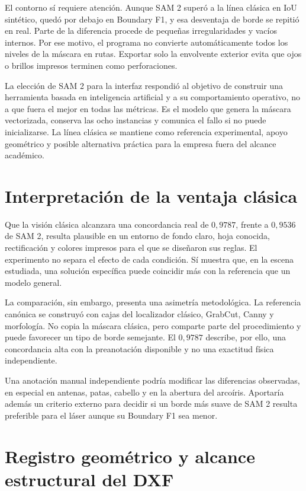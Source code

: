 El contorno sí requiere atención. Aunque SAM 2 superó a la línea clásica en IoU sintético, quedó por debajo en Boundary F1, y esa desventaja de borde se repitió en real. Parte de la diferencia procede de pequeñas irregularidades y vacíos internos. Por ese motivo, el programa no convierte automáticamente todos los niveles de la máscara en rutas. Exportar solo la envolvente exterior evita que ojos o brillos impresos terminen como perforaciones.

La elección de SAM 2 para la interfaz respondió al objetivo de construir una herramienta basada en inteligencia artificial y a su comportamiento operativo, no a que fuera el mejor en todas las métricas. Es el modelo que genera la máscara vectorizada, conserva las ocho instancias y comunica el fallo si no puede inicializarse. La línea clásica se mantiene como referencia experimental, apoyo geométrico y posible alternativa práctica para la empresa fuera del alcance académico.

\section{Interpretación de la ventaja clásica}

Que la visión clásica alcanzara una concordancia real de $0{,}9787$, frente a $0{,}9536$ de SAM 2, resulta plausible en un entorno de fondo claro, hoja conocida, rectificación y colores impresos para el que se diseñaron sus reglas. El experimento no separa el efecto de cada condición. Sí muestra que, en la escena estudiada, una solución específica puede coincidir más con la referencia que un modelo general.

La comparación, sin embargo, presenta una asimetría metodológica. La referencia canónica se construyó con cajas del localizador clásico, GrabCut, Canny y morfología. No copia la máscara clásica, pero comparte parte del procedimiento y puede favorecer un tipo de borde semejante. El $0{,}9787$ describe, por ello, una concordancia alta con la preanotación disponible y no una exactitud física independiente.

Una anotación manual independiente podría modificar las diferencias observadas, en especial en antenas, patas, cabello y en la abertura del arcoíris. Aportaría además un criterio externo para decidir si un borde más suave de SAM 2 resulta preferible para el láser aunque su Boundary F1 sea menor.

\section{Registro geométrico y alcance estructural del DXF}

